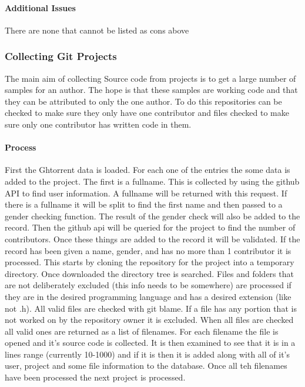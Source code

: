 \documentclass{article}
\begin{document}
\paragraph{Additional Issues}
There are none that cannot be listed as cons above

\subsubsection{Collecting Git Projects}
The main aim of collecting Source code from projects is to get a large number of samples for an author. The hope is that these samples are working code and that they can be attributed to only the one author. To do this repositories can be checked to make sure they only have one contributor and files checked to make sure only one contributor has written code in them.

\paragraph{Process}
First the Ghtorrent data is loaded. For each one of the entries the some data is added to the project. The first is a fullname. This is collected by using the github API to find user information. A fullname will be returned with this request. If there is a fullname it will be split to find the first name and then passed to a gender checking function. The result of the gender check will also be added to the record. Then the github api will be queried for the project to find the number of contributors. Once these things are added to the record it will be validated. If the record has been given a name, gender, and has no more than 1 contributor it is processed. This starts by cloning the repository for the project into a temporary directory. Once downloaded the directory tree is searched. Files and folders that are not deliberately excluded (this info needs to be somewhere) are processed if they are in the desired programming language and has a desired extension (like not .h). All valid files are checked with git blame. If a file has any portion that is not worked on by the repository owner it is excluded. When all files are checked all valid ones are returned as a list of filenames. For each filename the file is opened and it's source code is collected. It is then examined to see that it is in a lines range (currently 10-1000) and if it is then it is added along with all of it's user, project and some file information to the database. Once all teh filenames have been processed the next project is processed.
\end{document}
